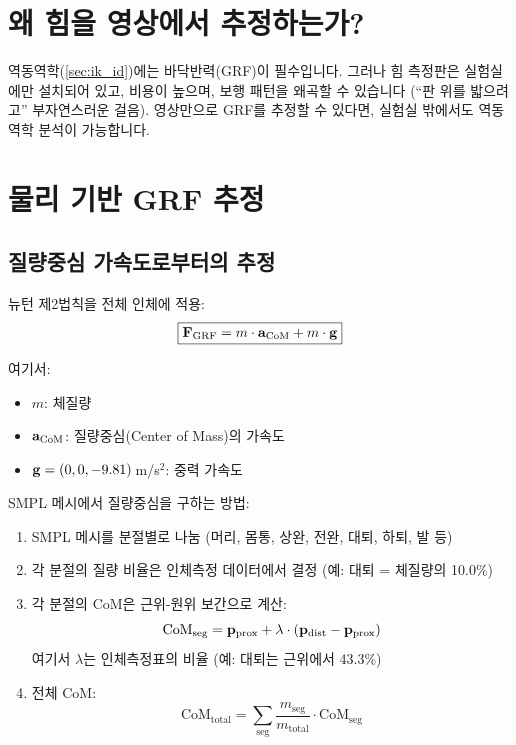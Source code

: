 \documentclass[11pt, a4paper]{report}
\begin{document}
\section{왜 힘을 영상에서 추정하는가?}

역동역학(\cref{sec:ik_id})에는 바닥반력(GRF)이 필수입니다. 그러나 힘 측정판은 실험실에만 설치되어 있고, 비용이 높으며, 보행 패턴을 왜곡할 수 있습니다 (``판 위를 밟으려고'' 부자연스러운 걸음). 영상만으로 GRF를 추정할 수 있다면, 실험실 밖에서도 역동역학 분석이 가능합니다.


\section{물리 기반 GRF 추정}

\subsection{질량중심 가속도로부터의 추정}

뉴턴 제2법칙을 전체 인체에 적용:
\begin{equation}
\boxed{
\mathbf{F}_{\text{GRF}} = m \cdot \mathbf{a}_{\text{CoM}} + m \cdot \mathbf{g}
}
\label{eq:grf_from_com}
\end{equation}

여기서:
\begin{itemize}[leftmargin=*]
  \item $m$: 체질량
  \item $\mathbf{a}_{\text{CoM}}$: 질량중심(Center of Mass)의 가속도
  \item $\mathbf{g} = (0, 0, -9.81)$\,m/s$^2$: 중력 가속도
\end{itemize}

\begin{biomechbox}[title={질량중심은 어떻게 구하는가?}]
SMPL 메시에서 질량중심을 구하는 방법:
\begin{enumerate}[leftmargin=*]
  \item SMPL 메시를 분절별로 나눔 (머리, 몸통, 상완, 전완, 대퇴, 하퇴, 발 등)
  \item 각 분절의 질량 비율은 인체측정 데이터에서 결정 (예: 대퇴 = 체질량의 10.0\%)
  \item 각 분절의 CoM은 근위-원위 보간으로 계산:
  \begin{equation}
    \text{CoM}_{\text{seg}} = \mathbf{p}_{\text{prox}} + \lambda \cdot (\mathbf{p}_{\text{dist}} - \mathbf{p}_{\text{prox}})
  \end{equation}
  여기서 $\lambda$는 인체측정표의 비율 (예: 대퇴는 근위에서 43.3\%)
  \item 전체 CoM:
  \begin{equation}
    \text{CoM}_{\text{total}} = \sum_{\text{seg}} \frac{m_{\text{seg}}}{m_{\text{total}}} \cdot \text{CoM}_{\text{seg}}
  \end{equation}
\end{enumerate}
\end{biomechbox}
\end{document}
